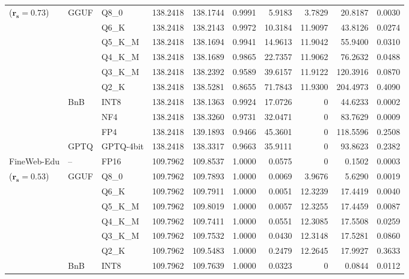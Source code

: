 \begin{table}[t]
{\begin{tabular}{ll l rrrrrrr}
{\small ($\mathbf{r_s{=}0.73}$)} & GGUF & Q8\_0 & 138.2418 & 138.1744 & 0.9991 & 5.9183 & 3.7829 & 20.8187 & 0.0030 \\
 &  & Q6\_K & 138.2418 & 138.2143 & 0.9972 & 10.3184 & 11.9097 & 43.8126 & 0.0274 \\
 &  & Q5\_K\_M & 138.2418 & 138.1694 & 0.9941 & 14.9613 & 11.9042 & 55.9400 & 0.0310 \\
 &  & Q4\_K\_M & 138.2418 & 138.1689 & 0.9865 & 22.7357 & 11.9062 & 76.2632 & 0.0488 \\
 &  & Q3\_K\_M & 138.2418 & 138.2392 & 0.9589 & 39.6157 & 11.9122 & 120.3916 & 0.0870 \\
 &  & Q2\_K & 138.2418 & 138.5281 & \cellcolor{red!18} 0.8655 & \cellcolor{red!18} 71.7843 & 11.9300 & \cellcolor{red!18} 204.4973 & \cellcolor{red!18} 0.4090 \\
 & BnB & INT8 & 138.2418 & 138.1363 & 0.9924 & 17.0726 & \cellcolor{cyan!12} $0$ & 44.6233 & 0.0002 \\
 &  & NF4 & 138.2418 & 138.3260 & 0.9731 & 32.0471 & \cellcolor{cyan!12} $0$ & 83.7629 & 0.0009 \\
 &  & FP4 & 138.2418 & 139.1893 & \cellcolor{red!18} 0.9466 & \cellcolor{red!18} 45.3601 & \cellcolor{cyan!12} $0$ & \cellcolor{red!18} 118.5596 & \cellcolor{red!18} 0.2508 \\
 & GPTQ & GPTQ-4bit & 138.2418 & 138.3317 & 0.9663 & 35.9111 & \cellcolor{cyan!12} $0$ & 93.8623 & 0.2382 \\
\midrule
FineWeb-Edu & -- & FP16 & 109.7962 & 109.8537 & 1.0000 & 0.0575 & \cellcolor{cyan!12} $0$ & 0.1502 & 0.0003 \\
{\small ($\mathbf{r_s{=}0.53}$)} & GGUF & Q8\_0 & 109.7962 & 109.7893 & 1.0000 & 0.0069 & 3.9676 & 5.6290 & 0.0019 \\
 &  & Q6\_K & 109.7962 & 109.7911 & 1.0000 & 0.0051 & 12.3239 & 17.4419 & 0.0040 \\
 &  & Q5\_K\_M & 109.7962 & 109.8019 & 1.0000 & 0.0057 & 12.3255 & 17.4459 & 0.0087 \\
 &  & Q4\_K\_M & 109.7962 & 109.7411 & 1.0000 & 0.0551 & 12.3085 & 17.5508 & 0.0259 \\
 &  & Q3\_K\_M & 109.7962 & 109.7532 & 1.0000 & 0.0430 & 12.3148 & 17.5281 & 0.0860 \\
 &  & Q2\_K & 109.7962 & 109.5483 & 1.0000 & 0.2479 & 12.2645 & 17.9927 & 0.3633 \\
 & BnB & INT8 & 109.7962 & 109.7639 & 1.0000 & 0.0323 & \cellcolor{cyan!12} $0$ & 0.0844 & 0.0112 \\

\end{tabular}}
\end{table}
